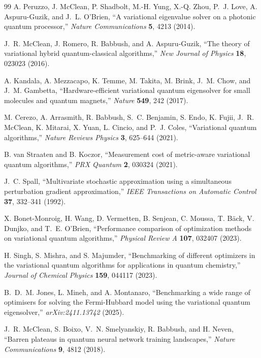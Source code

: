 \documentclass[
  reprint,
  amsmath,
  amssymb,
  aps,
  pra,
  nofootinbib,
  superscriptaddress,
  floatfix
]{revtex4-2}
\begin{document}
\begin{thebibliography}{99}
A. Peruzzo, J. McClean, P. Shadbolt, M.-H. Yung, X.-Q. Zhou, P.~J. Love, A. Aspuru-Guzik, and J.~L. O'Brien,
``A variational eigenvalue solver on a photonic quantum processor,''
\emph{Nature Communications} \textbf{5}, 4213 (2014).

J.~R. McClean, J. Romero, R. Babbush, and A. Aspuru-Guzik,
``The theory of variational hybrid quantum-classical algorithms,''
\emph{New Journal of Physics} \textbf{18}, 023023 (2016).

A. Kandala, A. Mezzacapo, K. Temme, M. Takita, M. Brink, J.~M. Chow, and J.~M. Gambetta,
``Hardware-efficient variational quantum eigensolver for small molecules and quantum magnets,''
\emph{Nature} \textbf{549}, 242 (2017).

M. Cerezo, A. Arrasmith, R. Babbush, S.~C. Benjamin, S. Endo, K. Fujii, J.~R. McClean, K. Mitarai, X. Yuan, L. Cincio, and P.~J. Coles,
``Variational quantum algorithms,''
\emph{Nature Reviews Physics} \textbf{3}, 625--644 (2021).

B. van Straaten and B. Koczor,
``Measurement cost of metric-aware variational quantum algorithms,''
\emph{PRX Quantum} \textbf{2}, 030324 (2021).

J.~C. Spall,
``Multivariate stochastic approximation using a simultaneous perturbation gradient approximation,''
\emph{IEEE Transactions on Automatic Control} \textbf{37}, 332--341 (1992).

X. Bonet-Monroig, H. Wang, D. Vermetten, B. Senjean, C. Moussa, T. B\"ack, V. Dunjko, and T.~E. O'Brien,
``Performance comparison of optimization methods on variational quantum algorithms,''
\emph{Physical Review A} \textbf{107}, 032407 (2023).

H. Singh, S. Mishra, and S. Majumder,
``Benchmarking of different optimizers in the variational quantum algorithms for applications in quantum chemistry,''
\emph{Journal of Chemical Physics} \textbf{159}, 044117 (2023).

B.~D.~M. Jones, L. Mineh, and A. Montanaro,
``Benchmarking a wide range of optimisers for solving the Fermi-Hubbard model using the variational quantum eigensolver,''
\emph{arXiv:2411.13742} (2025).

J.~R. McClean, S. Boixo, V.~N. Smelyanskiy, R. Babbush, and H. Neven,
``Barren plateaus in quantum neural network training landscapes,''
\emph{Nature Communications} \textbf{9}, 4812 (2018).


\end{thebibliography}
\end{document}
